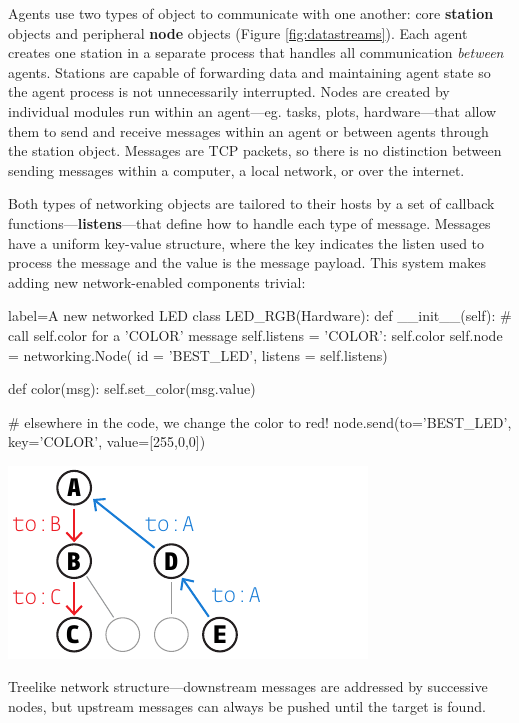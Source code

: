 Agents use two types of object to communicate with one another: core \textbf{station} objects and peripheral \textbf{node} objects (Figure \ref{fig:datastreams}). Each agent creates one station in a separate process that handles all communication \textit{between} agents. Stations are capable of forwarding data and maintaining agent state so the agent process is not unnecessarily interrupted. Nodes are created by individual modules run within an agent---eg. tasks, plots, hardware---that allow them to send and receive messages within an agent or between agents through the station object. Messages are TCP packets, so there is no distinction between sending messages within a computer, a local network, or over the internet.

Both types of networking objects are tailored to their hosts by a set of callback functions---\textbf{listens}---that define how to handle each type of message. Messages have a uniform key-value structure, where the key indicates the listen used to process the message and the value is the message payload. This system makes adding new network-enabled components trivial:

\begin{pythoncode*}{label=A new networked LED}
class LED_RGB(Hardware):
    def __init__(self):
        # call self.color for a 'COLOR' message
        self.listens = {'COLOR': self.color}
        self.node = networking.Node(
            id      = 'BEST_LED',
            listens = self.listens)
        
    def color(msg):
        self.set_color(msg.value)
        
# elsewhere in the code, we change the color to red!
node.send(to='BEST_LED', key='COLOR', value=[255,0,0])
\end{pythoncode*}

\begin{marginfigure}[2.4cm]
\includegraphics[]{figures/side_25_tree.pdf}
\caption{Treelike network structure---downstream messages are addressed by successive nodes, but upstream messages can always be pushed until the target is found.}
\label{fig:nettree}
\end{marginfigure}

